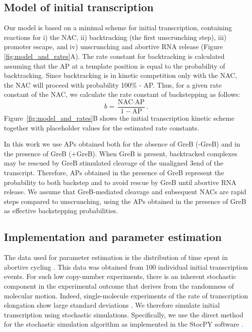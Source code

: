 %
\subsection{Model of initial transcription}
Our model is based on a minimal scheme for initial transcription, containing
reactions for i) the NAC, ii) backtracking (the
first unscrunching step), iii) promoter escape, and iv) unscrunching and
abortive RNA release (Figure \ref{fig:model_and_rates}A). The rate constant
for backtracking is calculated assuming that the AP at a template position is
equal to the probability of backtracking. Since backtracking is in kinetic
competition only with the NAC, the NAC will proceed with probability 100\% -
AP. Thus, for a given rate constant of the NAC, we calculate the rate
constant of backstepping as follows:
\begin{equation}
  b = \frac{\text{NAC}\cdot\text{AP}}{1-\text{AP}}.
  \label{eq:backtrackingcalc}
\end{equation}
Figure~\ref{fig:model_and_rates}B shows the initial transcription kinetic
scheme together with placeholder values for the estimated rate constants.

In this work we use APs obtained both for the absence of GreB (-GreB) and in
the presence of GreB (+GreB). When GreB is present, backtracked complexes may
be rescued by GreB stimulated cleavage of the unaligned 3\ppp end of the
transcript. Therefore, APs obtained in the presence of GreB represent the
probability to both backstep and to avoid rescue by GreB until abortive RNA
release. We assume that GreB-mediated cleavage and subsequent NACs are rapid
steps compared to unscrunching, using the APs obtained in the presence of GreB
as effective backstepping probabilities.

\subsection{Implementation and parameter estimation}
The data used for parameter estimation is the distribution of time spent in
abortive cycling \cite{revyakin_abortive_2006}. This data was obtained from
100 individual initial transcription events. For such low copy-number
experiments, there is an inherent stochastic component in the experimental
outcome that derives from the randomness of molecular motion. Indeed,
single-molecule experiments of the rate of transcription elongation show large
standard deviations \cite{adelman_single_2002,
tolic-norrelykke_diversity_2004}. We therefore simulate initial transcription
using stochastic simulations. Specifically, we use the direct method for the
stochastic simulation algorithm \cite{gillespie_exact_1977} as implemented in
the StocPY software \cite{maarleveld_stochpy:_2013}. 

